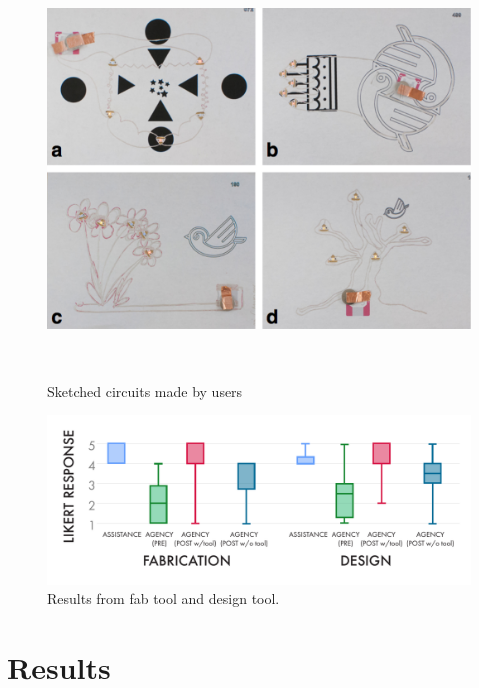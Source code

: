\documentclass{sigchi}
\begin{document}
\begin{figure}
\centering
  \includegraphics[width=1\columnwidth]{figures/Ellustrate_figures_Users_artwork}
  \caption{Sketched circuits made by users}~\label{fig:user-artwork}
\end{figure}




\begin{figure}[t]
\centering
\includegraphics[width=1.0\columnwidth]{charts/boxplots_quant.pdf}
\caption{Results from fab tool and design tool. }
\label{fig:fab_tool_results}
\end{figure}

\section{Results}
\end{document}
